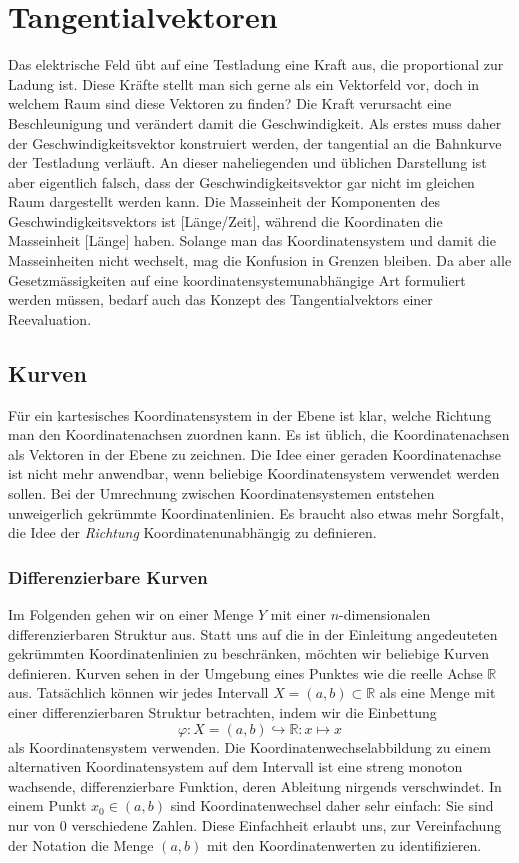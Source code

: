 %
%
%
\section{Tangentialvektoren
\label{buch:koordinaten:section:tangentialvektoren}}
Das elektrische Feld übt auf eine Testladung eine Kraft aus, die
proportional zur Ladung ist.
Diese Kräfte stellt man sich gerne als ein Vektorfeld vor, doch
in welchem Raum sind diese Vektoren zu finden?
Die Kraft verursacht eine Beschleunigung und verändert damit 
die Geschwindigkeit.
Als erstes muss daher der Geschwindigkeitsvektor konstruiert werden,
der tangential an die Bahnkurve der Testladung verläuft.
An dieser naheliegenden und üblichen Darstellung ist aber eigentlich
falsch, dass der Geschwindigkeitsvektor gar nicht im gleichen Raum
dargestellt werden kann.
Die Masseinheit der Komponenten des Geschwindigkeitsvektors ist
[Länge/Zeit], während die Koordinaten die Masseinheit [Länge] haben.
Solange man das Koordinatensystem und damit die Masseinheiten nicht
wechselt, mag die Konfusion in Grenzen bleiben.
Da aber alle Gesetzmässigkeiten auf eine koordinatensystemunabhängige
Art formuliert werden müssen, bedarf auch das Konzept des Tangentialvektors
einer Reevaluation.

%
%
\subsection{Kurven}
Für ein kartesisches Koordinatensystem in der Ebene ist klar, welche
Richtung man den Koordinatenachsen zuordnen kann.
Es ist üblich, die Koordinatenachsen als Vektoren in der Ebene
zu zeichnen.
Die Idee einer geraden Koordinatenachse ist nicht mehr anwendbar,
wenn beliebige Koordinatensystem verwendet werden sollen.
Bei der Umrechnung zwischen Koordinatensystemen entstehen unweigerlich
gekrümmte Koordinatenlinien.
Es braucht also etwas mehr Sorgfalt, die Idee der {\em Richtung}
Koordinatenunabhängig zu definieren.

\subsubsection{Differenzierbare Kurven}
Im Folgenden gehen wir on einer Menge $Y$ mit einer $n$-dimensionalen
differenzierbaren Struktur aus.
Statt uns auf die in der Einleitung angedeuteten gekrümmten
Koordinatenlinien zu beschränken, möchten wir beliebige Kurven
definieren.
Kurven sehen in der Umgebung eines Punktes wie die reelle Achse
$\mathbb{R}$ aus.
Tatsächlich können wir jedes Intervall $X=(a,b)\subset\mathbb{R}$ als
eine Menge mit einer differenzierbaren Struktur betrachten, indem
wir die Einbettung
\[
\varphi
\colon
X=(a,b) \hookrightarrow \mathbb{R}
:
x\mapsto x
\]
als Koordinatensystem verwenden.
Die Koordinatenwechselabbildung zu einem alternativen Koordinatensystem
auf dem Intervall ist eine streng monoton wachsende, differenzierbare
Funktion, deren Ableitung nirgends verschwindet.
In einem Punkt $x_0\in (a,b)$ sind Koordinatenwechsel daher sehr
einfach: Sie sind nur von 0 verschiedene Zahlen.
Diese Einfachheit erlaubt uns, zur Vereinfachung der Notation die Menge
$(a,b)$ mit den Koordinatenwerten zu identifizieren.

